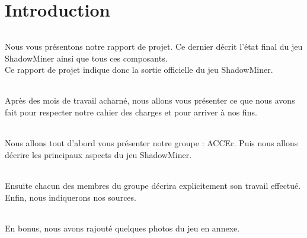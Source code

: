 \documentclass[titlepage, 13px, a4paper]{report}
\begin{document}
\AddToShipoutPicture*{\BackgroundPic}

\maketitle
\tableofcontents


\part{Introduction} 
\paragraph{} \hspace{0pt}
Nous vous présentons notre rapport de projet. Ce dernier décrit l’état final du jeu ShadowMiner 
ainsi que tous ces composants. \\
Ce rapport de projet indique donc la sortie officielle du jeu ShadowMiner. \\

\paragraph{} \hspace{0pt}
Après des mois de travail acharné, nous allons vous présenter ce que nous avons fait pour respecter 
notre cahier des charges et pour arriver à nos fins. \\

\paragraph{} \hspace{0pt}
Nous allons tout d’abord vous présenter notre groupe : ACCEr. Puis nous allons décrire les 
principaux aspects du jeu ShadowMiner. \\

\paragraph{} \hspace{0pt}
Ensuite chacun des membres du groupe décrira explicitement son travail effectué. \\
Enfin, nous indiquerons nos sources. \\

\paragraph{} \hspace{0pt}
En bonus, nous avons rajouté quelques photos du jeu en annexe. \\
\end{document}
